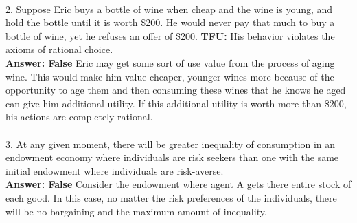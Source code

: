 \documentclass[11pt]{article}
\begin{document}
\\
2. Suppose Eric buys a bottle of wine when cheap and the wine is young, and hold the bottle until it is worth \$200. He would never pay that much to buy a bottle of wine, yet he refuses an offer of \$200. \textbf{TFU: }His behavior violates the axioms of rational choice.\\
\textbf{Answer: False} Eric may get some sort of use value from the process of aging wine. This would make him value cheaper, younger wines more because of the opportunity to age them and then consuming these wines that he knows he aged can give him additional utility. If this additional utility is worth more than \$200, his actions are completely rational.\\
\\
3. At any given moment, there will be greater inequality of consumption in an endowment economy where individuals are risk seekers than one with the same initial endowment where individuals are risk-averse.\\
\textbf{Answer: False} Consider the endowment where agent A gets there entire stock of each good. In this case, no matter the risk preferences of the individuals, there will be no bargaining and the maximum amount of inequality. 
\end{document}

